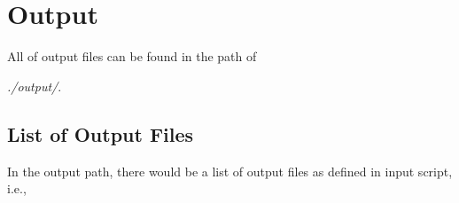 
\chapter{Output}  %

All of output files can be found in the path of

\quad \textsl{./output/}.

\label{Chapter4}  %



\section{List of Output Files}

In the output path, there would be a list of output files as defined in input script, i.e.,

